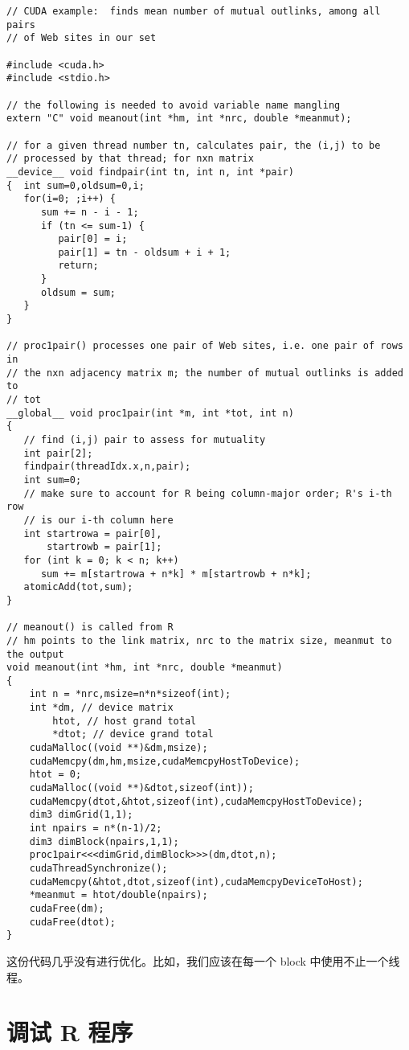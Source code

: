 \begin{lstlisting}
// CUDA example:  finds mean number of mutual outlinks, among all pairs
// of Web sites in our set

#include <cuda.h>
#include <stdio.h>

// the following is needed to avoid variable name mangling
extern "C" void meanout(int *hm, int *nrc, double *meanmut);

// for a given thread number tn, calculates pair, the (i,j) to be
// processed by that thread; for nxn matrix
__device__ void findpair(int tn, int n, int *pair)
{  int sum=0,oldsum=0,i;
   for(i=0; ;i++) {
      sum += n - i - 1;
      if (tn <= sum-1) {
         pair[0] = i;
         pair[1] = tn - oldsum + i + 1;
         return;
      }
      oldsum = sum;
   }
}

// proc1pair() processes one pair of Web sites, i.e. one pair of rows in
// the nxn adjacency matrix m; the number of mutual outlinks is added to
// tot
__global__ void proc1pair(int *m, int *tot, int n)
{
   // find (i,j) pair to assess for mutuality
   int pair[2];
   findpair(threadIdx.x,n,pair);
   int sum=0;
   // make sure to account for R being column-major order; R's i-th row
   // is our i-th column here
   int startrowa = pair[0],
       startrowb = pair[1];
   for (int k = 0; k < n; k++)
      sum += m[startrowa + n*k] * m[startrowb + n*k];
   atomicAdd(tot,sum);
}

// meanout() is called from R
// hm points to the link matrix, nrc to the matrix size, meanmut to the output
void meanout(int *hm, int *nrc, double *meanmut)
{
    int n = *nrc,msize=n*n*sizeof(int);
    int *dm, // device matrix
        htot, // host grand total
        *dtot; // device grand total
    cudaMalloc((void **)&dm,msize);
    cudaMemcpy(dm,hm,msize,cudaMemcpyHostToDevice);
    htot = 0;
    cudaMalloc((void **)&dtot,sizeof(int));
    cudaMemcpy(dtot,&htot,sizeof(int),cudaMemcpyHostToDevice);
    dim3 dimGrid(1,1);
    int npairs = n*(n-1)/2;
    dim3 dimBlock(npairs,1,1);
    proc1pair<<<dimGrid,dimBlock>>>(dm,dtot,n);
    cudaThreadSynchronize();
    cudaMemcpy(&htot,dtot,sizeof(int),cudaMemcpyDeviceToHost);
    *meanmut = htot/double(npairs);
    cudaFree(dm);
    cudaFree(dtot);
}

\end{lstlisting}

这份代码几乎没有进行优化。比如，我们应该在每一个 block 中使用不止一个线程。

\section{调试 R 程序}

